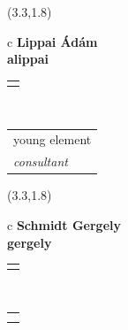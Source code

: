 \documentclass[11pt]{article}
\begin{document}
\makebox(3.3,1.8){
  \renewcommand\arraystretch{1.3}
  \begin{tabular}[c]{c}
    \hspace{8.5mm}
    \LARGE\bf{ Lippai Ádám }\\
    \hspace{8.5mm}
    \Large{ alippai }\\
    \renewcommand\arraystretch{3}
    \begin{tabular}[c]{c}
      \centering
      \fontfamily{phv}\selectfont{
        \textbf{
          \textsc{
            \scriptsize{
            \color{Bright}{ Ismerkedő }\color{Dark}{ Webmester }\color{Dark}{ Sminkmester }\color{Dark}{ Programozó }
            }
          }
        }
      }
    \end{tabular}
    \\
    \renewcommand\arraystretch{1}
    \begin{tabular}{p{3.3in}}
      \hspace{.7cm}young element\\
      \hspace{.7cm}\emph{ consultant }\\
    \end{tabular}
  \end{tabular}
}

\makebox(3.3,1.8){
  \renewcommand\arraystretch{1.3}
  \begin{tabular}[c]{c}
    \hspace{8.5mm}
    \LARGE\bf{ Schmidt Gergely }\\
    \hspace{8.5mm}
    \Large{ gergely }\\
    \renewcommand\arraystretch{3}
    \begin{tabular}[c]{c}
      \centering
      \fontfamily{phv}\selectfont{
        \textbf{
          \textsc{
            \scriptsize{
            \color{Bright}{ Ismerkedő }\color{Dark}{ Webmester }\color{Dark}{ Sminkmester }\color{Bright}{ Programozó }
            }
          }
        }
      }
    \end{tabular}
    \\
    \renewcommand\arraystretch{1}
    \begin{tabular}{p{3.3in}}
      \hspace{.7cm}\\
      \hspace{.7cm}\emph{  }\\
    \end{tabular}
  \end{tabular}
}
\end{document}

